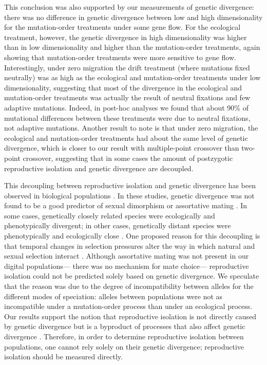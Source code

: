 \begin{doublespace}
This conclusion was also supported by our measurements of genetic divergence:
there was no difference in genetic divergence between low and high
dimensionality for the mutation-order treatments under some gene flow.
%
For the ecological treatment, however, the genetic divergence in high
dimensionality was higher than in low dimensionality and higher than the
mutation-order treatments, again showing that mutation-order treatments were
more sensitive to gene flow.
%
Interestingly, under zero migration the drift treatment (where mutations fixed
neutrally) was as high as the ecological and mutation-order treatments under
low dimensionality, suggesting that most of the divergence in the ecological
and mutation-order treatments was actually the result of neutral fixations and
few adaptive mutations.
%
Indeed, in post-hoc analyses we found that about 90\% of mutational differences
between these treatments were due to neutral fixations, not adaptive mutations.
%
Another result to note is that under zero migration, the ecological and
mutation-order treatments had about the same level of genetic divergence, which
is closer to our result with multiple-point crossover than two-point crossover,
suggesting that in some cases the amount of postzygotic reproductive isolation
and genetic divergence are decoupled.



This decoupling between reproductive isolation and genetic divergence
has been observed in biological populations \citep{ste09,mac12}.
%
In these studies, genetic divergence was not found to be a good predictor
of sexual dimorphism or assortative mating \citep{ste09,mac12}.
%
In some cases, genetically closely related species
were ecologically and phenotypically divergent;
in other cases, genetically distant species
were phenotypically and ecologically close \citep{ste09}.
%
One proposed reason for this decoupling
is that temporal changes in selection pressures
alter the way in which natural and sexual selection interact \citep{mac12}.
%
Although assortative mating was not present in our digital populations---%
there was no mechanism for mate choice---%
reproductive isolation could not be predicted
solely based on genetic divergence.
%
We speculate that the reason was due to the degree of incompatibility
between alleles for the different modes of speciation:
alleles between populations were not as incompatible
under a mutation-order process than under an ecological process.
%
Our results support the notion that reproductive isolation
is not directly caused by genetic divergence but is a byproduct
of processes that also affect genetic divergence \citep{per11}.
%
Therefore, in order to determine reproductive isolation between populations,
one cannot rely solely on their genetic divergence;
reproductive isolation should be measured directly.




\end{doublespace}
